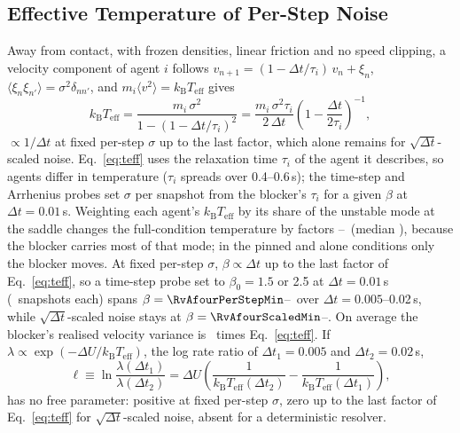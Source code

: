 \subsection{Effective Temperature of Per-Step Noise}\label{sec:teff}
Away from contact, with frozen densities, linear friction and no speed clipping, a velocity component of agent $i$ follows $v_{n+1}=(1-\Delta t/\tau_i)\,v_n+\xi_n$, $\langle\xi_n\xi_{n'}\rangle=\sigma^2\delta_{nn'}$, and $m_i\langle v^2\rangle=k_{\mathrm{B}}T_{\mathrm{eff}}$ gives
\begin{equation}\label{eq:teff}
k_{\mathrm{B}}T_{\mathrm{eff}}=\frac{m_i\,\sigma^2}{1-(1-\Delta t/\tau_i)^2}=\frac{m_i\,\sigma^2\tau_i}{2\,\Delta t}\left(1-\frac{\Delta t}{2\tau_i}\right)^{-1},
\end{equation}
$\propto1/\Delta t$ at fixed per-step $\sigma$ up to the last factor, which alone remains for $\sqrt{\Delta t}$-scaled noise. Eq.~\eqref{eq:teff} uses the relaxation time $\tau_i$ of the agent it describes, so agents differ in temperature ($\tau_i$ spreads over 0.4--0.6\,s); the time-step and Arrhenius probes set $\sigma$ per snapshot from the blocker's $\tau_i$ for a given $\beta$ at $\Delta t=0.01$\,s. Weighting each agent's $k_{\mathrm{B}}T_{\mathrm{eff}}$ by its share of the unstable mode at the saddle changes the full-condition temperature by factors \RvAsevenCMin--\RvAsevenCMax\ (median \RvAsevenCMed), because the blocker carries most of that mode; in the pinned and alone conditions only the blocker moves.
At fixed per-step $\sigma$, $\beta\propto\Delta t$ up to the last factor of Eq.~\eqref{eq:teff}, so a time-step probe set to $\beta_0=1.5$ or 2.5 at $\Delta t=0.01$\,s (\RvAfourNLevel\ snapshots each) spans $\beta=\RvAfourPerStepMin$--\RvAfourPerStepMax\ over $\Delta t=0.005$--0.02\,s, while $\sqrt{\Delta t}$-scaled noise stays at $\beta=\RvAfourScaledMin$--\RvAfourScaledMax. On average the blocker's realised velocity variance is \PprotVarRatio\ times Eq.~\eqref{eq:teff}. If $\lambda\propto\exp(-\Delta U/k_{\mathrm{B}}T_{\mathrm{eff}})$, the log rate ratio of $\Delta t_1=0.005$ and $\Delta t_2=0.02$\,s,
\begin{equation}\label{eq:ell}
\ell\equiv\ln\frac{\lambda(\Delta t_1)}{\lambda(\Delta t_2)}=\Delta U\left(\frac{1}{k_{\mathrm{B}}T_{\mathrm{eff}}(\Delta t_2)}-\frac{1}{k_{\mathrm{B}}T_{\mathrm{eff}}(\Delta t_1)}\right),
\end{equation}
has no free parameter: positive at fixed per-step $\sigma$, zero up to the last factor of Eq.~\eqref{eq:teff} for $\sqrt{\Delta t}$-scaled noise, absent for a deterministic resolver.

